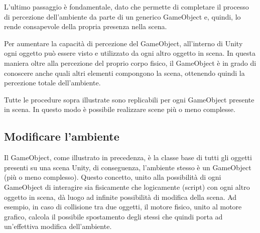 \medskip

L'ultimo passaggio è fondamentale, dato che permette di completare il processo di percezione dell'ambiente da parte di un generico GameObject e, quindi, lo rende consapevole della propria presenza nella scena.

\medskip

Per aumentare la capacità di percezione del GameObject, all'interno di Unity ogni oggetto può essere visto e utilizzato da ogni altro oggetto in scena. In questa maniera oltre alla percezione del proprio corpo fisico, il GameObject è in grado di conoscere anche quali altri elementi compongono la scena, ottenendo quindi la percezione totale dell'ambiente.

\medskip

Tutte le procedure sopra illustrate sono replicabili per ogni GameObject presente in scena. In questo modo è possibile realizzare scene più o meno complesse.

\subsection{Modificare l'ambiente}

Il GameObject, come illustrato in precedenza, è la classe base di tutti gli oggetti presenti su una scena Unity, di conseguenza, l'ambiente stesso è un GameObject (più o meno complesso). Questo concetto, unito alla possibilità di ogni GameObject di interagire sia fisicamente che logicamente (script) con ogni altro oggetto in scena, dà luogo ad infinite possibilità di modifica della scena. Ad esempio, in caso di collisione tra due oggetti, il motore fisico, unito al motore grafico, calcola il possibile spostamento degli stessi che quindi porta ad un'effettiva modifica dell'ambiente.
